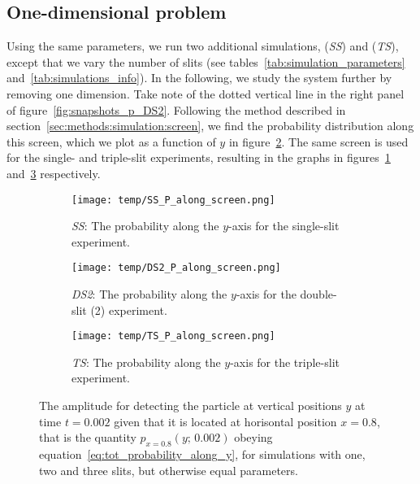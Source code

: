 \subsection{One-dimensional problem}

    Using the same parameters, we run two additional simulations, (\textit{SS}) and (\textit{TS}), except that we vary the number of slits (see tables~\ref{tab:simulation_parameters} and~\ref{tab:simulations_info}). In the following, we study the system further by removing one dimension. Take note of the dotted vertical line in the right panel of figure~\ref{fig:snapshots_p_DS2}. Following the method described in section~\ref{sec:methods:simulation:screen}, we find the probability distribution along this screen, which we plot as a function of $y$ in figure~\ref{fig:p_along_y_DS2}. The same screen is used for the single- and triple-slit experiments, resulting in the graphs in figures~\ref{fig:p_along_y_SS} and~\ref{fig:p_along_y_TS} respectively. %

    \begin{figure}
        \centering
        \begin{subfigure}{0.46\textwidth}
            \texttt{[image: temp/SS\_P\_along\_screen.png]}
            \caption{\textit{SS}: The probability along the $y$-axis for the single-slit experiment.}
            \label{fig:p_along_y_SS}
        \end{subfigure}
        \hfill
        \begin{subfigure}{0.46\textwidth}
            \texttt{[image: temp/DS2\_P\_along\_screen.png]}
            \caption{\textit{DS2}: The probability along the $y$-axis for the double-slit (2) experiment.}
            \label{fig:p_along_y_DS2}
        \end{subfigure}
        \hfill
        \begin{subfigure}{0.46\textwidth}
            \texttt{[image: temp/TS\_P\_along\_screen.png]}
            \caption{\textit{TS}: The probability along the $y$-axis for the triple-slit experiment.}
            \label{fig:p_along_y_TS}
        \end{subfigure}
        \caption{The amplitude for detecting the particle at vertical positions $y$ at time $t=0.002$ given that it is located at horisontal position $x=0.8$, that is the quantity $p_{x=0.8}(y;\, 0.002)$ obeying equation~\eqref{eq:tot_probability_along_y}, for simulations with one, two and three slits, but otherwise equal parameters.}
        \label{fig:p_along_y}
    \end{figure}






